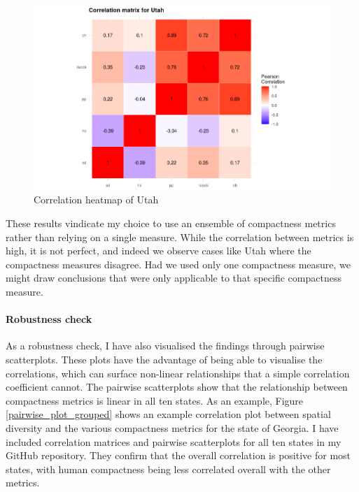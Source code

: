 \documentclass[]{article}
\let\oldparagraph\paragraph
\renewcommand{\paragraph}[1]{\oldparagraph{#1}\mbox{}}
\begin{document}
\begin{figure}
\centering
\includegraphics{../30_results/corr_matrix_utah.png}
\caption{Correlation heatmap of Utah \label{utah_corr}}
\end{figure}

These results vindicate my choice to use an ensemble of compactness
metrics rather than relying on a single measure. While the correlation
between metrics is high, it is not perfect, and indeed we observe cases
like Utah where the compactness measures disagree. Had we used only one
compactness measure, we might draw conclusions that were only applicable
to that specific compactness measure.

\hypertarget{robustness-check}{%
\paragraph{Robustness check}\label{robustness-check}}

As a robustness check, I have also visualised the findings through
pairwise scatterplots. These plots have the advantage of being able to
visualise the correlations, which can surface non-linear relationships
that a simple correlation coefficient cannot. The pairwise scatterplots
show that the relationship between compactness metrics is linear in all
ten states. As an example, Figure \ref{pairwise_plot_grouped} shows an
example correlation plot between spatial diversity and the various
compactness metrics for the state of Georgia. I have included
correlation matrices and pairwise scatterplots for all ten states in my
GitHub repository. They confirm that the overall correlation is positive
for most states, with human compactness being less correlated overall
with the other metrics.
\end{document}
